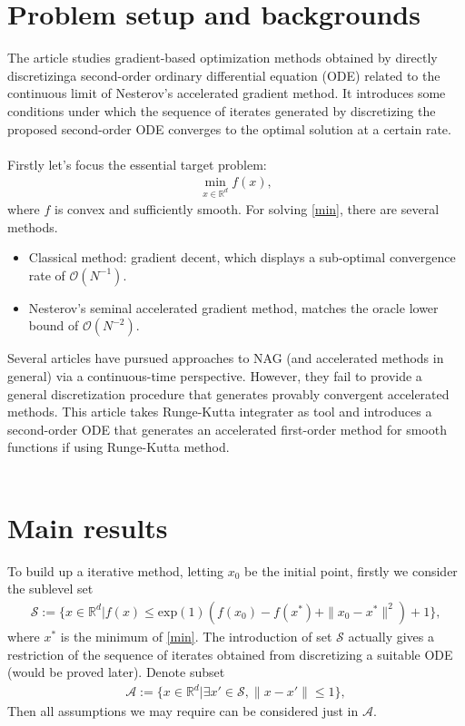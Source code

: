 

\section{Problem setup and backgrounds}

The article \cite{NEURIPS2018_44968aec} studies gradient-based optimization methods obtained by directly
discretizinga second-order ordinary differential equation (ODE) related to the
continuous limit of Nesterov's accelerated gradient method. It introduces some
conditions under which the sequence of iterates generated by discretizing the
proposed second-order ODE converges to the optimal solution at a certain rate.\\\\
Firstly let's focus the essential target problem:
\begin{align}\label{min}
  \mathop{\mathrm{min}}\limits_{x \in \mathbb{R}^{d}} f(x),
\end{align}
where $f$ is convex and sufficiently smooth. For solving \eqref{min}, there are several
methods.
\begin{itemize}
  \item Classical method: gradient decent, which displays a sub-optimal convergence rate of $\mathcal{O}(N^{-1})$.
  \item Nesterov's seminal accelerated gradient method, matches the oracle lower bound of $\mathcal{O}(N^{-2})$.
\end{itemize}
Several articles have pursued approaches to NAG (and accelerated methods in general)
via a continuous-time perspective. However, they fail to provide a general
discretization procedure that generates provably convergent accelerated methods.
This article takes Runge-Kutta integrater as tool and introduces a second-order ODE
that generates an accelerated first-order method for smooth functions if using
Runge-Kutta method.\\\\

\section{Main results}
To build up a iterative method, letting $x_{0}$ be the initial point, firstly we
consider the sublevel set
\begin{align}\label{sublevel_set}
  \mathcal{S} := \{ x \in \mathbb{R}^{d} | f(x) \leq \mathrm{exp}(1) (f(x_{0})
  - f(x^{*}) + \|x_{0} - x^{*}\|^{2}) + 1 \},
\end{align}
where $x^{*}$ is the minimum of \eqref{min}. The introduction of set $\mathcal{S}$
actually gives a restriction of the sequence of iterates obtained from
discretizing a suitable ODE (would be proved later). Denote subset
\begin{align}
  \mathcal{A} := \{ x \in \mathbb{R}^{d} | \exists x' \in \mathcal{S}, \|x-x'\| \leq 1 \},
\end{align}
Then all assumptions we may require can be considered just in $\mathcal{A}$.

